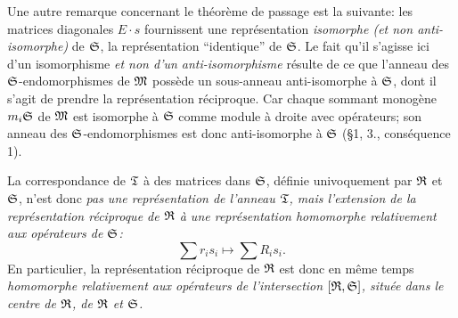 Une autre remarque concernant le théorème de passage est la suivante: les matrices diagonales \(E\cdot s\) fournissent une représentation \emph{isomorphe (et non anti-isomorphe)} de \(\mathfrak S\), la représentation ``identique'' de \(\mathfrak S\). Le fait qu'il s'agisse ici d'un isomorphisme \emph{et non d'un anti-isomorphisme} résulte de ce que l'anneau des \(\mathfrak S\)-endomorphismes de \(\mathfrak M\) possède un sous-anneau anti-isomorphe à \(\mathfrak S\), dont il s'agit de prendre la représentation réciproque. Car chaque sommant monogène \(m_i\mathfrak S\) de \(\mathfrak M\) est isomorphe à \(\mathfrak S\) comme module à droite avec opérateurs; son anneau des \(\mathfrak S\)-endomorphismes est donc anti-isomorphe à \(\mathfrak S\) (\S 1, 3., conséquence 1).

La correspondance de \(\mathfrak T\) à des matrices dans \(\mathfrak S\), définie univoquement par \(\mathfrak R\) et \(\mathfrak S\), n'est donc \emph{pas une représentation de l'anneau \(\mathfrak T\), mais l'extension de la représentation réciproque de \(\mathfrak R\) à une représentation homomorphe relativement aux opérateurs de \(\mathfrak S\):}
\[
        \sum r_i s_i\longmapsto \sum R_i s_i.
\]
En particulier, la représentation réciproque de \(\mathfrak R\) est donc en même temps \emph{homomorphe relativement aux opérateurs de l'intersection \([\mathfrak R,\mathfrak S]\), située dans le centre de \(\mathfrak R\), de \(\mathfrak R\) et \(\mathfrak S\).}

\clearpage
